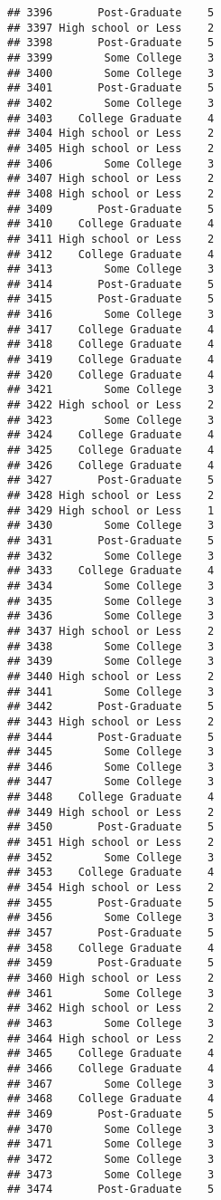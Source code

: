 \documentclass[
]{article}
\begin{document}
\begin{verbatim}
## 3396       Post-Graduate    5
## 3397 High school or Less    2
## 3398       Post-Graduate    5
## 3399        Some College    3
## 3400        Some College    3
## 3401       Post-Graduate    5
## 3402        Some College    3
## 3403    College Graduate    4
## 3404 High school or Less    2
## 3405 High school or Less    2
## 3406        Some College    3
## 3407 High school or Less    2
## 3408 High school or Less    2
## 3409       Post-Graduate    5
## 3410    College Graduate    4
## 3411 High school or Less    2
## 3412    College Graduate    4
## 3413        Some College    3
## 3414       Post-Graduate    5
## 3415       Post-Graduate    5
## 3416        Some College    3
## 3417    College Graduate    4
## 3418    College Graduate    4
## 3419    College Graduate    4
## 3420    College Graduate    4
## 3421        Some College    3
## 3422 High school or Less    2
## 3423        Some College    3
## 3424    College Graduate    4
## 3425    College Graduate    4
## 3426    College Graduate    4
## 3427       Post-Graduate    5
## 3428 High school or Less    2
## 3429 High school or Less    1
## 3430        Some College    3
## 3431       Post-Graduate    5
## 3432        Some College    3
## 3433    College Graduate    4
## 3434        Some College    3
## 3435        Some College    3
## 3436        Some College    3
## 3437 High school or Less    2
## 3438        Some College    3
## 3439        Some College    3
## 3440 High school or Less    2
## 3441        Some College    3
## 3442       Post-Graduate    5
## 3443 High school or Less    2
## 3444       Post-Graduate    5
## 3445        Some College    3
## 3446        Some College    3
## 3447        Some College    3
## 3448    College Graduate    4
## 3449 High school or Less    2
## 3450       Post-Graduate    5
## 3451 High school or Less    2
## 3452        Some College    3
## 3453    College Graduate    4
## 3454 High school or Less    2
## 3455       Post-Graduate    5
## 3456        Some College    3
## 3457       Post-Graduate    5
## 3458    College Graduate    4
## 3459       Post-Graduate    5
## 3460 High school or Less    2
## 3461        Some College    3
## 3462 High school or Less    2
## 3463        Some College    3
## 3464 High school or Less    2
## 3465    College Graduate    4
## 3466    College Graduate    4
## 3467        Some College    3
## 3468    College Graduate    4
## 3469       Post-Graduate    5
## 3470        Some College    3
## 3471        Some College    3
## 3472        Some College    3
## 3473        Some College    3
## 3474       Post-Graduate    5

\end{verbatim}
\end{document}
